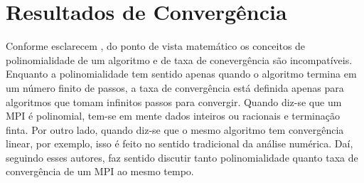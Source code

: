 



\chapter{Resultados de Convergência}


\label{chap:convergence}


Conforme esclarecem \textcite{Zhang:1993gn}, do ponto de vista matemático os conceitos de polinomialidade de um algoritmo e de taxa de conevergência são incompatíveis. Enquanto a polinomialidade tem sentido apenas quando o algoritmo termina em um número finito de passos, a taxa de convergência  está definida apenas para algoritmos que tomam infinitos passos para convergir. Quando diz-se que um \acl{MPI} é polinomial, tem-se em mente dados inteiros ou racionais e terminação finta. Por outro lado, quando diz-se que o mesmo algoritmo tem convergência linear, por exemplo, isso é feito  no sentido tradicional da análise numérica.
Daí, seguindo esses autores, faz sentido discutir tanto polinomialidade quanto taxa de convergência de um \ac{MPI} ao mesmo tempo. 






